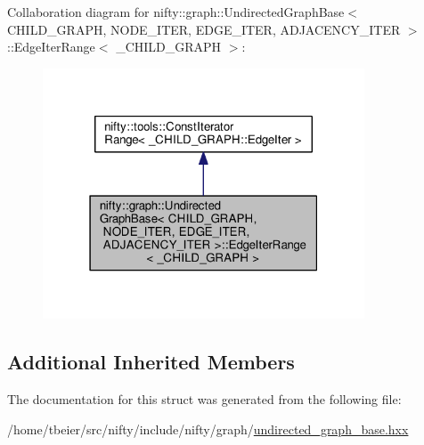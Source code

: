 Collaboration diagram for nifty\+:\+:graph\+:\+:Undirected\+Graph\+Base$<$ C\+H\+I\+L\+D\+\_\+\+G\+R\+A\+P\+H, N\+O\+D\+E\+\_\+\+I\+T\+E\+R, E\+D\+G\+E\+\_\+\+I\+T\+E\+R, A\+D\+J\+A\+C\+E\+N\+C\+Y\+\_\+\+I\+T\+E\+R $>$\+:\+:Edge\+Iter\+Range$<$ \+\_\+\+C\+H\+I\+L\+D\+\_\+\+G\+R\+A\+P\+H $>$\+:\nopagebreak
\begin{figure}[H]
\begin{center}
\leavevmode
\includegraphics[width=271pt]{structnifty_1_1graph_1_1UndirectedGraphBase_1_1EdgeIterRange__coll__graph}
\end{center}
\end{figure}
\subsection*{Additional Inherited Members}


The documentation for this struct was generated from the following file\+:\begin{DoxyCompactItemize}
\item 
/home/tbeier/src/nifty/include/nifty/graph/\hyperlink{undirected__graph__base_8hxx}{undirected\+\_\+graph\+\_\+base.\+hxx}\end{DoxyCompactItemize}
